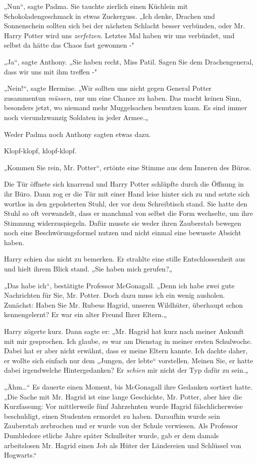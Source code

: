 {„Nun“, sagte Padma. Sie tauchte zierlich einen Küchlein mit Schokoladengeschmack in etwas Zuckerguss. „Ich denke, Drachen und Sonnenschein sollten sich bei der nächsten Schlacht besser verbünden, oder Mr. Harry Potter wird uns \emph{zerfetzen}. Letztes Mal haben wir uns verbündet, und selbst da hätte das Chaos fast gewonnen -"

„Ja“, sagte Anthony. „Sie haben recht, Miss Patil. Sagen Sie dem Drachengeneral, dass wir uns mit ihm treffen -"

„Nein!“, sagte Hermine. „Wir sollten uns nicht gegen General Potter zusammentun \emph{müssen}, nur um eine Chance zu haben. Das macht keinen Sinn, besonders jetzt, wo niemand mehr Muggelsachen benutzen kann. Es sind immer noch vierundzwanzig Soldaten in jeder Armee.„

Weder Padma noch Anthony sagten etwas dazu.

Klopf-klopf, klopf-klopf.

„Kommen Sie rein, Mr. Potter“, ertönte eine Stimme aus dem Inneren des Büros.

Die Tür öffnete sich knarrend und Harry Potter schlüpfte durch die Öffnung in ihr Büro. Dann zog er die Tür mit einer Hand leise hinter sich zu und setzte sich wortlos in den gepolsterten Stuhl, der vor dem Schreibtisch stand. Sie hatte den Stuhl so oft verwandelt, dass er manchmal von selbst die Form wechselte, um ihre Stimmung widerzuspiegeln. Dafür musste sie weder ihren Zauberstab bewegen noch eine Beschwörungsformel nutzen und nicht einmal eine bewusste Absicht haben.

Harry schien das nicht zu bemerken. Er strahlte eine stille Entschlossenheit aus und hielt ihrem Blick stand. „Sie haben mich gerufen?„

„Das habe ich“, bestätigte Professor McGonagall. „Denn ich habe zwei gute Nachrichten für Sie, Mr. Potter. Doch dazu muss ich ein wenig ausholen. Zunächst: Haben Sie Mr. Rubeus Hagrid, unseren Wildhüter, überhaupt schon kennengelernt? Er war ein alter Freund Ihrer Eltern.„

Harry zögerte kurz. Dann sagte er: „Mr. Hagrid hat kurz nach meiner Ankunft mit mir gesprochen. Ich glaube, es war am Dienstag in meiner ersten Schulwoche. Dabei hat er aber nicht erwähnt, dass er meine Eltern kannte. Ich dachte daher, er wollte sich einfach nur dem „Jungen, der lebte“ vorstellen. Meinen Sie, er hatte dabei irgendwelche Hintergedanken? Er \emph{schien} mir nicht der Typ dafür zu sein.„

„Ähm…“ Es dauerte einen Moment, bis McGonagall ihre Gedanken sortiert hatte. „Die Sache mit Mr. Hagrid ist eine lange Geschichte, Mr. Potter, aber hier die Kurzfassung: Vor mittlerweile fünf Jahrzehnten wurde Hagrid fälschlicherweise beschuldigt, einen Studenten ermordet zu haben. Daraufhin wurde sein Zauberstab zerbrochen und er wurde von der Schule verwiesen. Als Professor Dumbledore etliche Jahre später Schulleiter wurde, gab er dem damals arbeitslosen Mr. Hagrid einen Job als Hüter der Ländereien und Schlüssel von Hogwarts.“

}
